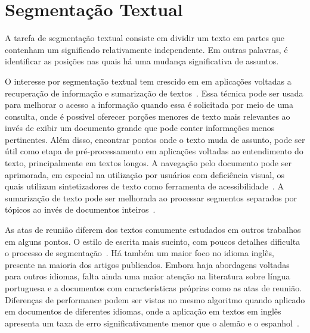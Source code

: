 \section{Segmentação Textual}


A tarefa de segmentação textual consiste em dividir um texto em partes que contenham um significado relativamente independente. Em outras palavras, é identificar as posições nas quais há uma mudança significativa de assuntos. 

O interesse por segmentação textual tem crescido em em aplicações voltadas a recuperação de informação %
e sumarização de textos~\cite{Maziero2016}. %
Essa técnica pode ser usada para melhorar o acesso a informação quando essa é solicitada por meio de uma consulta, onde é possível oferecer porções menores de texto mais relevantes ao invés de exibir um documento grande que pode conter informações menos pertinentes. 
%
Além disso, encontrar pontos onde o texto muda de assunto, pode ser útil como etapa de pré-processamento em aplicações voltadas ao entendimento do texto, principalmente em textos longos.
%
A navegação pelo documento pode ser aprimorada, em especial na utilização por usuários com deficiência visual, os quais utilizam  sintetizadores de texto como ferramenta de acessibilidade~\cite{Choi2000}. 
%
A sumarização de texto pode ser melhorada ao processar segmentos separados por tópicos ao invés de documentos inteiros~\cite{Bhatia2016, Maziero2016, Bokaei2016}. 




%  
As atas de reunião diferem dos textos comumente estudados em outros trabalhos em alguns pontos. O estilo de escrita mais sucinto, com poucos detalhes dificulta o processo de segmentação~\cite{Choi2001-LSA}. Há também um maior foco no idioma inglês, presente na maioria dos artigos publicados. Embora haja abordagens voltadas para outros idiomas, falta ainda uma maior atenção na literatura sobre língua portuguesa e a documentos com características próprias como as atas de reunião. Diferenças de performance podem ser vistas no mesmo algoritmo quando aplicado em documentos de diferentes idiomas, onde a aplicação em textos em inglês apresenta um taxa de erro significativamente menor que o alemão e o espanhol~\cite{Kern2009,Sitbon2004}.






